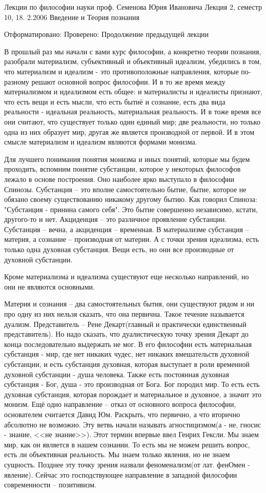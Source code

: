 
Лекции по философии науки проф. Семенова Юрия Ивановича
Лекция 2, семестр 10, 18. 2.2006
Введение и Теория познания

Отформатировано: Проверено:
Продолжение предыдущей лекции

В прошлый раз мы начали с вами курс философии, а конкретно теории познания, разобрали материализм, субъективный и объективный идеализм, убедились в том, что материализм и идеализм - это противоположные направления, которые по-разному решают основной вопрос философии. И в то же время между материализмом и идеализмом есть общее: и материалисты и идеалисты признают, что есть вещи и есть мысли, что есть бытиё и сознание, есть два вида реальности - идеальная реальность, материальная реальность. И в тоже время все они считают, что существует только один единый мир; две реальности, но только одна из них образует мир, другая же является производной от первой. И в этом смысле материализм и идеализм являются формами монизма.

Для лучшего понимания понятия монизма и иных понятий, которые мы будем проходить, вспомним понятие субстанции, которое у некоторых философов лежало в основе построения. Оно наиболее ярко выступало в философии Спинозы. Субстанция – это вполне самостоятельно бытие, бытие, которое не обязано своему существованию никакому другому бытию. Как говорил Спиноза: "Субстанция - принина самого себя". Это бытие совершенно независимо, кстати, другого-то и нет. Акциденция – это различное проявление субстанции. Субстанция – вечна, а акциденция – временная. В материализме субстанция – материя, а сознание – производная от материи. А с точки зрения идеализма, есть только одна духовная субстанция. Вещи есть, но они все производные от духовной субстанции.

Кроме материализма и идеализма существуют еще несколько направлений, но они не являются основными.

    Материя и сознания – два самостоятельных бытия, они существуют рядом и ни про одну из них нельзя сказать, что она первична. Такое течение называется дуализм. Представитель – Рене Декарт(главный и практически единственный представитель). Но надо сказать, что дуалистическую точку зрения Декарт до конца последовательно выдержать не мог. В его философии есть материальная субстанция - мир, где нет никаких чудес, нет никаких вмешательств духовной субстанции, и есть субстанция духовная, которая выступает в роли временной духовной субстанции - душа человека. Также есть постоянная духовная субстанция - Бог, душа - это производная от Бога. Бог породил мир. То есть есть духовная субстанция, которая порождает и материальное и духовное, а значит это монизм.
    Ещё одно направление – отказ от основного вопроса философии, основателем считается Давид Юм. Раскрыть, что первично, а что вторично абсолютно не возможно. Эту ветвь начали называть агностицизмом(а - не, гносис - знание, <<не знание>>). Этот термин впервые ввел Генрих Гексли. Мы знаем мир, как он является в нашем сознании. То есть мы не можем решить вопрос, есть ли объективная реальность. Мы знаем только явления, но не знаем сущность. Позднее эту точку зрения назвали феноменализм(от лат. фенОмен - явление). Сейчас это господствующее направление в западной философии современности – позитивизм.

